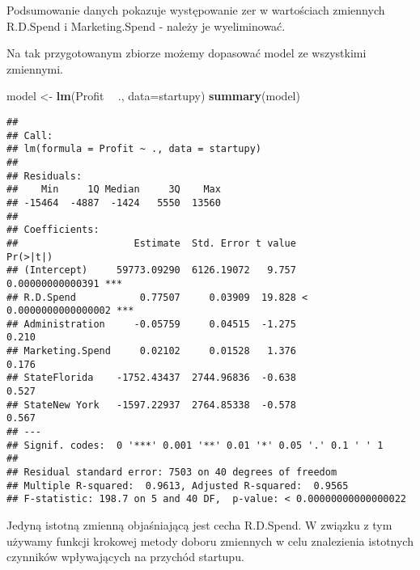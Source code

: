 \documentclass[]{book}
\newenvironment{Shaded}{\begin{snugshade}}{\end{snugshade}}
\newcommand{\KeywordTok}[1]{\textcolor[rgb]{0.13,0.29,0.53}{\textbf{#1}}}
\newcommand{\DataTypeTok}[1]{\textcolor[rgb]{0.13,0.29,0.53}{#1}}
\newcommand{\DecValTok}[1]{\textcolor[rgb]{0.00,0.00,0.81}{#1}}
\newcommand{\StringTok}[1]{\textcolor[rgb]{0.31,0.60,0.02}{#1}}
\newcommand{\OperatorTok}[1]{\textcolor[rgb]{0.81,0.36,0.00}{\textbf{#1}}}
\newcommand{\NormalTok}[1]{#1}
\begin{document}
Podsumowanie danych pokazuje występowanie zer w wartościach zmiennych
R.D.Spend i Marketing.Spend - należy je wyeliminować.

\begin{Shaded}
\end{Shaded}

Na tak przygotowanym zbiorze możemy dopasować model ze wszystkimi
zmiennymi.

\begin{Shaded}
\begin{Highlighting}[]
\NormalTok{model <-}\StringTok{ }\KeywordTok{lm}\NormalTok{(Profit }\OperatorTok{~}\StringTok{ }\NormalTok{., }\DataTypeTok{data=}\NormalTok{startupy)}
\KeywordTok{summary}\NormalTok{(model)}
\end{Highlighting}
\end{Shaded}

\begin{verbatim}
## 
## Call:
## lm(formula = Profit ~ ., data = startupy)
## 
## Residuals:
##    Min     1Q Median     3Q    Max 
## -15464  -4887  -1424   5550  13560 
## 
## Coefficients:
##                    Estimate  Std. Error t value             Pr(>|t|)    
## (Intercept)     59773.09290  6126.19072   9.757     0.00000000000391 ***
## R.D.Spend           0.77507     0.03909  19.828 < 0.0000000000000002 ***
## Administration     -0.05759     0.04515  -1.275                0.210    
## Marketing.Spend     0.02102     0.01528   1.376                0.176    
## StateFlorida    -1752.43437  2744.96836  -0.638                0.527    
## StateNew York   -1597.22937  2764.85338  -0.578                0.567    
## ---
## Signif. codes:  0 '***' 0.001 '**' 0.01 '*' 0.05 '.' 0.1 ' ' 1
## 
## Residual standard error: 7503 on 40 degrees of freedom
## Multiple R-squared:  0.9613, Adjusted R-squared:  0.9565 
## F-statistic: 198.7 on 5 and 40 DF,  p-value: < 0.00000000000000022
\end{verbatim}

Jedyną istotną zmienną objaśniającą jest cecha R.D.Spend. W związku z
tym używamy funkcji krokowej metody doboru zmiennych w celu znalezienia
istotnych czynników wpływających na przychód startupu.
\end{document}
